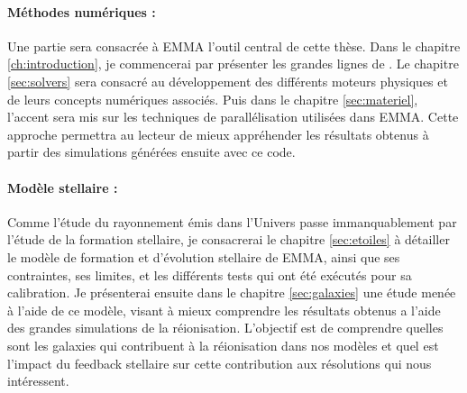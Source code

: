 \paragraph{Méthodes numériques :}
Une partie sera consacrée à EMMA l'outil central de cette thèse.
Dans le chapitre \ref{ch:introduction}, je commencerai par présenter les grandes lignes de \emma. %
Le chapitre \ref{sec:solvers} sera consacré au développement des différents moteurs physiques et de leurs concepts numériques associés.
Puis dans le chapitre \ref{sec:materiel}, l'accent sera mis sur les techniques de parallélisation utilisées dans EMMA.
Cette approche permettra au lecteur de mieux appréhender les résultats obtenus à partir des simulations générées ensuite avec ce code.

\paragraph{Modèle stellaire :}
Comme l'étude du rayonnement émis dans l'Univers passe immanquablement par l'étude de la formation stellaire, je consacrerai le chapitre \ref{sec:etoiles} à détailler le modèle de formation et d'évolution stellaire de EMMA, ainsi que ses contraintes, ses limites, et les différents tests qui ont été exécutés pour sa calibration.
Je présenterai ensuite dans le chapitre \ref{sec:galaxies} une étude menée à l'aide de ce modèle, visant à mieux comprendre les résultats obtenus a l'aide des grandes simulations de la réionisation.
L'objectif est de comprendre quelles sont les galaxies qui contribuent à la réionisation dans nos modèles et quel est l'impact du feedback stellaire sur cette contribution aux résolutions qui nous intéressent.

